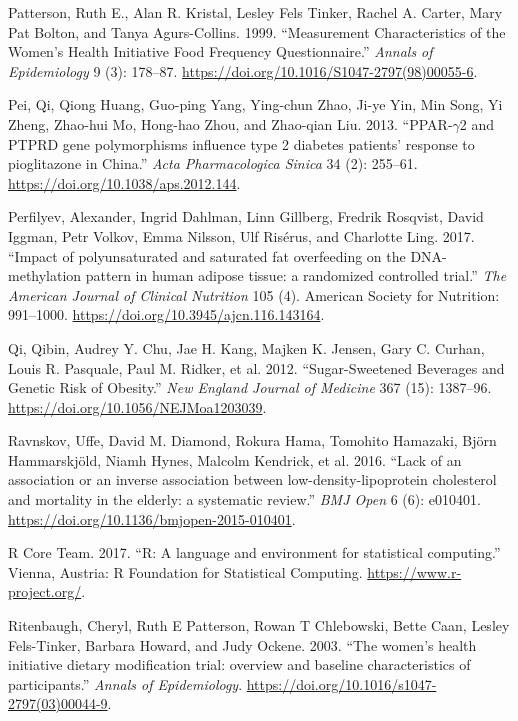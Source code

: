 \documentclass[]{article}
\begin{document}
\leavevmode\hypertarget{ref-Patterson1999}{}%
Patterson, Ruth E., Alan R. Kristal, Lesley Fels Tinker, Rachel A.
Carter, Mary Pat Bolton, and Tanya Agurs-Collins. 1999. ``Measurement
Characteristics of the Women's Health Initiative Food Frequency
Questionnaire.'' \emph{Annals of Epidemiology} 9 (3): 178--87.
\url{https://doi.org/10.1016/S1047-2797(98)00055-6}.

\leavevmode\hypertarget{ref-Pei2013}{}%
Pei, Qi, Qiong Huang, Guo-ping Yang, Ying-chun Zhao, Ji-ye Yin, Min
Song, Yi Zheng, Zhao-hui Mo, Hong-hao Zhou, and Zhao-qian Liu. 2013.
``PPAR-\(\gamma\)2 and PTPRD gene polymorphisms influence type 2
diabetes patients' response to pioglitazone in China.'' \emph{Acta
Pharmacologica Sinica} 34 (2): 255--61.
\url{https://doi.org/10.1038/aps.2012.144}.

\leavevmode\hypertarget{ref-Perfilyev2017}{}%
Perfilyev, Alexander, Ingrid Dahlman, Linn Gillberg, Fredrik Rosqvist,
David Iggman, Petr Volkov, Emma Nilsson, Ulf Risérus, and Charlotte
Ling. 2017. ``Impact of polyunsaturated and saturated fat overfeeding on
the DNA-methylation pattern in human adipose tissue: a randomized
controlled trial.'' \emph{The American Journal of Clinical Nutrition}
105 (4). American Society for Nutrition: 991--1000.
\url{https://doi.org/10.3945/ajcn.116.143164}.

\leavevmode\hypertarget{ref-Qi2012}{}%
Qi, Qibin, Audrey Y. Chu, Jae H. Kang, Majken K. Jensen, Gary C. Curhan,
Louis R. Pasquale, Paul M. Ridker, et al. 2012. ``Sugar-Sweetened
Beverages and Genetic Risk of Obesity.'' \emph{New England Journal of
Medicine} 367 (15): 1387--96.
\url{https://doi.org/10.1056/NEJMoa1203039}.

\leavevmode\hypertarget{ref-Ravnskov2016}{}%
Ravnskov, Uffe, David M. Diamond, Rokura Hama, Tomohito Hamazaki, Björn
Hammarskjöld, Niamh Hynes, Malcolm Kendrick, et al. 2016. ``Lack of an
association or an inverse association between low-density-lipoprotein
cholesterol and mortality in the elderly: a systematic review.''
\emph{BMJ Open} 6 (6): e010401.
\url{https://doi.org/10.1136/bmjopen-2015-010401}.

\leavevmode\hypertarget{ref-RCoreTeam2017}{}%
R Core Team. 2017. ``R: A language and environment for statistical
computing.'' Vienna, Austria: R Foundation for Statistical Computing.
\url{https://www.r-project.org/}.

\leavevmode\hypertarget{ref-Ritenbaugh2003}{}%
Ritenbaugh, Cheryl, Ruth E Patterson, Rowan T Chlebowski, Bette Caan,
Lesley Fels-Tinker, Barbara Howard, and Judy Ockene. 2003. ``The women's
health initiative dietary modification trial: overview and baseline
characteristics of participants.'' \emph{Annals of Epidemiology}.
\url{https://doi.org/10.1016/s1047-2797(03)00044-9}.
\end{document}

